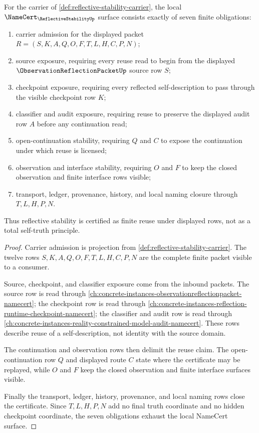 \begin{theorem}
\label{thm:reflective-stability-namecert-obligations}
For the carrier of \autoref{def:reflective-stability-carrier}, the local $\NameCert_{\ReflectiveStabilityUp}$ surface consists exactly of seven finite obligations:
\begin{enumerate}
\item carrier admission for the displayed packet $R=(S,K,A,Q,O,F,T,L,H,C,P,N)$;
\item source exposure, requiring every reuse read to begin from the displayed $\ObservationReflectionPacketUp$ source row $S$;
\item checkpoint exposure, requiring every reflected self-description to pass through the visible checkpoint row $K$;
\item classifier and audit exposure, requiring reuse to preserve the displayed audit row $A$ before any continuation read;
\item open-continuation stability, requiring $Q$ and $C$ to expose the continuation under which reuse is licensed;
\item observation and interface stability, requiring $O$ and $F$ to keep the closed observation and finite interface rows visible;
\item transport, ledger, provenance, history, and local naming closure through $T,L,H,P,N$.
\end{enumerate}
Thus reflective stability is certified as finite reuse under displayed rows, not as a total self-truth principle.
\end{theorem}
\begin{proof}
Carrier admission is projection from \autoref{def:reflective-stability-carrier}. The twelve rows $S,K,A,Q,O,F,T,L,H,C,P,N$ are the complete finite packet visible to a consumer.

Source, checkpoint, and classifier exposure come from the inbound packets. The source row is read through \autoref{ch:concrete-instances-observationreflectionpacket-namecert}; the checkpoint row is read through \autoref{ch:concrete-instances-reflection-runtime-checkpoint-namecert}; the classifier and audit row is read through \autoref{ch:concrete-instances-reality-constrained-model-audit-namecert}. These rows describe reuse of a self-description, not identity with the source domain.

The continuation and observation rows then delimit the reuse claim. The open-continuation row $Q$ and displayed route $C$ state where the certificate may be replayed, while $O$ and $F$ keep the closed observation and finite interface surfaces visible.

Finally the transport, ledger, history, provenance, and local naming rows close the certificate. Since $T,L,H,P,N$ add no final truth coordinate and no hidden checkpoint coordinate, the seven obligations exhaust the local NameCert surface.
\end{proof}

